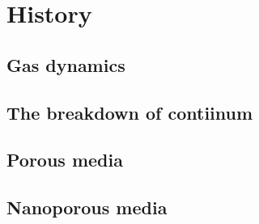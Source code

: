 \section{History}
\subsection{Gas dynamics}
\subsection{The breakdown of contiinum}
\subsection{Porous media}
\subsection{Nanoporous media}